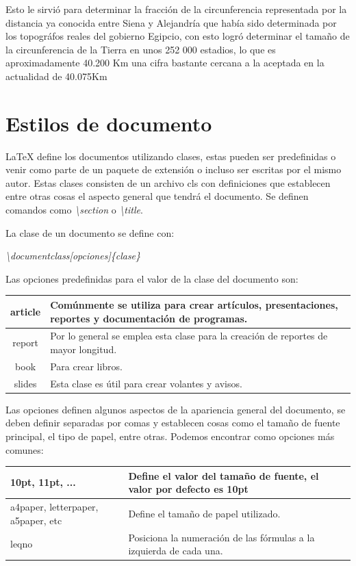 \documentclass[journal]{IEEEtran}
\begin{document}
Esto le sirvió para determinar la fracción de la circunferencia representada por la distancia ya conocida entre Siena y Alejandría que había sido 
determinada por los topográfos reales del gobierno Egipcio, con esto logró determinar el tamaño de la circunferencia 
de la Tierra en unos 252 000 estadios, lo que es aproximadamente 40.200 Km una cifra bastante cercana a la aceptada en la actualidad de 40.075Km

\section{Estilos de documento}

\LaTeX\xspace  define los documentos utilizando clases, estas pueden ser predefinidas o venir como parte de un paquete de extensión o incluso ser escritas por el mismo autor.
Estas clases consisten de un archivo cls con definiciones que establecen entre otras cosas el aspecto general que tendrá el documento.
Se definen comandos como \emph{\textbackslash{}section} o \emph{\textbackslash{}title}.

La clase de un documento se define con:

\begin{center}
  \emph{\textbackslash{}documentclass[opciones]\{clase\}}
\end{center}


Las opciones predefinidas para el valor de la clase del documento son:

\begin{tabular}[t]{|c|p{5cm}|}
  \hline
  article & Comúnmente se utiliza para crear artículos, presentaciones, reportes y documentación de programas. \\ \hline
  report & Por lo general se emplea esta clase para la creación de reportes de mayor longitud. \\ \hline
  book & Para crear libros. \\ \hline
  slides & Esta clase es útil para crear volantes y avisos. \\ \hline
\end{tabular}

\hfill \break
Las opciones definen algunos aspectos de la apariencia general del documento, se deben
definir separadas por comas y establecen cosas como el tamaño de fuente principal, el tipo de papel, entre otras.
Podemos encontrar como opciones más comunes:
\begin{center}
  \begin{tabular}[t]{|m{2cm}|m{3cm}|}
    \hline
    10pt, 11pt, ... & Define el valor del tamaño de fuente, el valor por defecto es 10pt \\ \hline
    a4paper, letterpaper, a5paper, etc & Define el tamaño de papel utilizado. \\ \hline
    leqno & Posiciona la numeración de las fórmulas a la izquierda de cada una. \\ \hline
  \end{tabular}  
\end{center}
\end{document}
